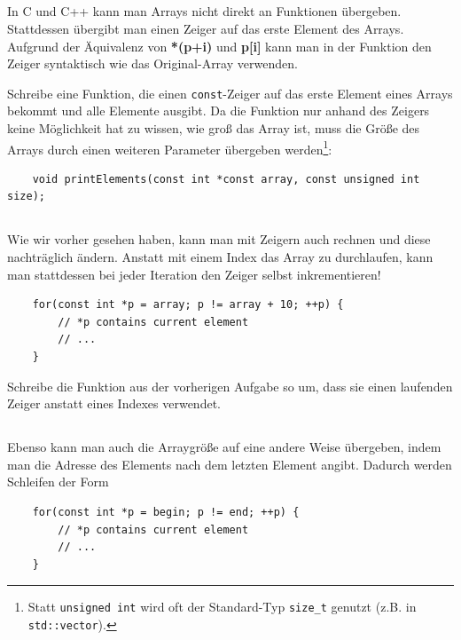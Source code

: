 \subsection{}
In C und C++ kann man Arrays nicht direkt an Funktionen übergeben.
Stattdessen übergibt man einen Zeiger auf das erste Element des Arrays. Aufgrund der Äquivalenz von \textbf{*(p+i) } und \textbf{p[i]} kann man in der Funktion den Zeiger syntaktisch wie das Original-Array verwenden.

Schreibe eine Funktion, die einen \texttt{const}-Zeiger auf das erste Element eines Arrays bekommt und alle Elemente ausgibt.
Da die Funktion nur anhand des Zeigers keine Möglichkeit hat zu wissen, wie groß das Array ist, muss die Größe des Arrays durch einen weiteren Parameter übergeben werden\footnote{Statt \texttt{unsigned int} wird oft der Standard-Typ \texttt{size\_t} genutzt (z.B. in \texttt{std::vector}).}:

\begin{lstlisting}
	void printElements(const int *const array, const unsigned int size);
\end{lstlisting}

\subsection{}
Wie wir vorher gesehen haben, kann man mit Zeigern auch rechnen und diese nachträglich ändern.
Anstatt mit einem Index das Array zu durchlaufen, kann man stattdessen bei jeder Iteration den Zeiger selbst inkrementieren!

\begin{lstlisting}
	for(const int *p = array; p != array + 10; ++p) {
		// *p contains current element
		// ...
	}
\end{lstlisting}

Schreibe die Funktion aus der vorherigen Aufgabe so um, dass sie einen laufenden Zeiger anstatt eines Indexes verwendet.

\subsection{}
Ebenso kann man auch die Arraygröße auf eine andere Weise übergeben, indem man die Adresse des Elements nach dem letzten Element angibt.
Dadurch werden Schleifen der Form

\begin{lstlisting}
	for(const int *p = begin; p != end; ++p) {
		// *p contains current element
		// ...
	}
\end{lstlisting}

